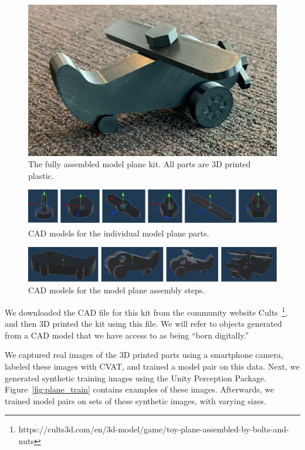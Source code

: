 \begin{figure}
  \includegraphics[width=\columnwidth]{figures/synthetic/toy_plane.jpg}
  \caption{
    The fully assembled model plane kit. All parts are 3D printed plastic.
  }\label{fig:assembled_plane}
\end{figure}

\begin{figure}
  \includegraphics[width=\columnwidth]{figures/synthetic/plane_parts.pdf}
  \caption{
    CAD models for the individual model plane parts.
  }\label{fig:plane_parts}
\end{figure}

\begin{figure}
  \includegraphics[width=\columnwidth]{figures/synthetic/plane_steps.pdf}
  \caption{
    CAD models for the model plane assembly steps.
  }\label{fig:plane_steps}
\end{figure}

We downloaded the CAD file for this kit from the community website
Cults~\footnote{https://cults3d.com/en/3d-model/game/toy-plane-assembled-by-bolts-and-nuts},
and then 3D printed the kit using this file.
We will refer to objects generated from a CAD model that we have access to as
being ``born digitally.''

We captured real images of the 3D printed parts using a smartphone camera,
labeled these images with CVAT, and trained a model pair on this data.
Next, we generated synthetic training images using the Unity Perception Package.
Figure~\ref{fig:plane_train} contains examples of these images.
Afterwards, we trained model pairs on sets of these synthetic images, with
varying sizes.

